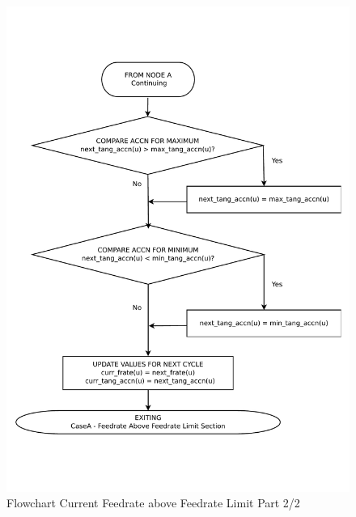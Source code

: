 \begin{figure}
	\caption{Flowchart Current Feedrate above Feedrate Limit Part 2/2}
	\label{02-CaseA2-Feedrate-Above-Limit-Main-Region-flowchart.pdf}
	\centering
	\includegraphics[width=1.10\textwidth,]{Images/Chap3/02-CaseA2-Feedrate-Above-Limit-Main-Region-flowchart.pdf} 
\end{figure}

\clearpage
\pagebreak

